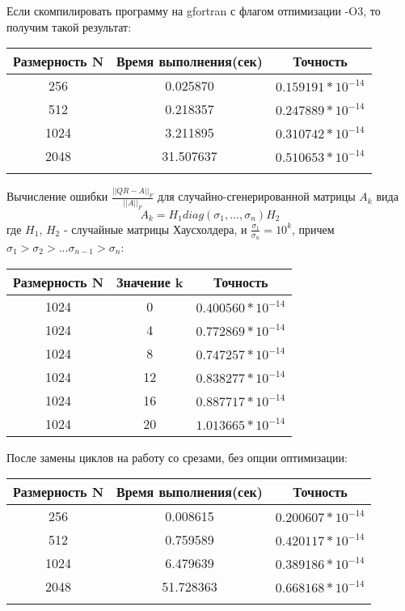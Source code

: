 \documentclass[10pt]{article}
\begin{document}
Если скомпилировать программу на gfortran с флагом отпимизации -O3, то получим такой результат:
\begin{center}
    \begin{tabular}{c|c|c}
      Размерность N & Время выполнения(сек) & Точность \\
      \hline
      256 & 0.025870 & $0.159191 * 10^{-14}$ \\
      \hline
      512 &  0.218357 & $0.247889 * 10^{-14}$ \\
      \hline
      1024 & 3.211895 & $0.310742 * 10^{-14}$ \\
      \hline
      2048 & 31.507637  & $0. 510653 * 10^{-14}$ \\
      \\
    \end{tabular}
\end{center}

Вычисление ошибки $\frac{||QR - A||_F}{||A||_F}$ для случайно-сгенерированной матрицы $A_k$
вида
$$ A_k = H_1 diag(\sigma_1, ..., \sigma_n) H_2$$
где $H_1$, $H_2$ - случайные матрицы Хаусхолдера, и $\frac{\sigma_1}{\sigma_n} = 10^k$, причем 
$\sigma_1 > \sigma_2 > ... \sigma_{n-1} > \sigma_n$:
\begin{center}
    \begin{tabular}{c|c|c}
      Размерность N & Значение k & Точность \\
      \hline
      1024 & 0 & $0.400560 * 10^{-14}$ \\
      \hline
      1024 & 4 & $0.772869 * 10^{-14}$ \\
      \hline
      1024 & 8 & $0.747257 * 10^{-14}$ \\
      \hline 
      1024 & 12 & $0.838277 * 10^{-14}$ \\
      \hline
      1024 & 16 & $0.887717 * 10^{-14}$ \\
      \hline
      1024 & 20 & $1.013665 * 10^{-14}$ \\
    \end{tabular}
\end{center}

После замены циклов на работу со срезами, без опции оптимизации:
\begin{center}
    \begin{tabular}{c|c|c}
      Размерность N & Время выполнения(сек) & Точность \\
      \hline
      256 & 0.008615 & $0.200607 * 10^{-14}$ \\
      \hline
      512 &  0.759589 & $0.420117 * 10^{-14}$ \\
      \hline
      1024 & 6.479639 & $0.389186 * 10^{-14}$ \\
      \hline
      2048 & 51.728363  & $0.668168 * 10^{-14}$ \\
      \\
    \end{tabular}
\end{center}
\end{document}
